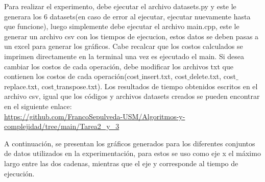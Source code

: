 Para realizar el experimento, debe ejecutar el archivo datasets.py y este le generara los 6 datasets(en caso de error al ejecutar, ejecutar nuevamente hasta que funcione), luego simplemente debe ejecutar el archivo main.cpp, este le generar un archivo csv con los tiempos de ejecucion, estos datos se deben pasas a un excel para generar los gráficos. Cabe recalcar que los costos calculados se imprimen directamente en la terminal una vez es ejecutado el main. Si desea cambiar los costos de cada operación, debe modificar los archivos txt que contienen los costos de cada operación(cost$\_$insert.txt, cost$\_$delete.txt, cost$\_$replace.txt, cost$\_$transpose.txt).
Los resultados de tiempo obtenidos escritos en el archivo csv, igual que los códigos y archivos datasets creados se pueden encontrar en el siguiente enlace:\\
\url{https://github.com/FrancoSepulveda-USM/Algoritmos-y-complejidad/tree/main/Tarea2_y_3}

A continuación, se presentan los gráficos generados para los diferentes conjuntos de datos utilizados en la experimentación, para estos se uso como eje x el máximo largo entre las dos cadenas, mientras que el eje y corresponde al tiempo de ejecución.

